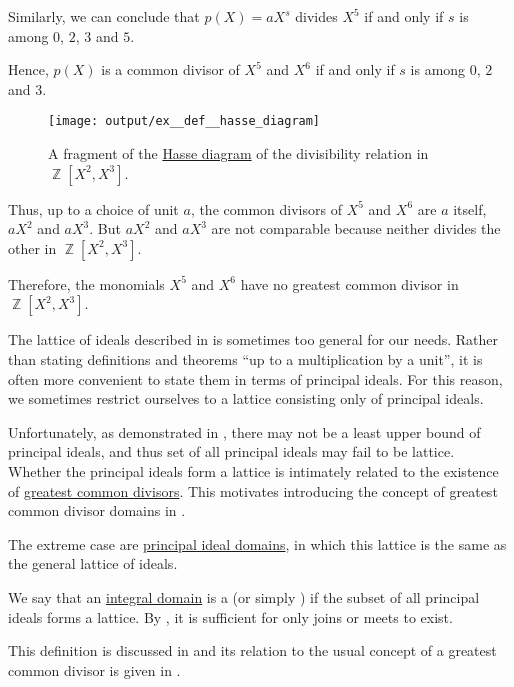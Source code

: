 \begin{example}
\begin{thmenum}
    Similarly, we can conclude that \( p(X) = aX^s \) divides \( X^5 \) if and only if \( s \) is among \( 0 \), \( 2 \), \( 3 \) and \( 5 \).

    Hence, \( p(X) \) is a common divisor of \( X^5 \) and \( X^6 \) if and only if \( s \) is among \( 0 \), \( 2 \) and \( 3 \).

    \begin{figure}[!ht]
      \centering
      \texttt{[image: output/ex\_\_def\_\_hasse\_diagram]}
      \caption{A fragment of the \hyperref[def:hasse_diagram]{Hasse diagram} of the divisibility relation in \( \BbbZ[X^2, X^3] \).}
      \label{fig:ex:common_polynomial_divisors/distinct}
    \end{figure}

    Thus, up to a choice of unit \( a \), the common divisors of \( X^5 \) and \( X^6 \) are \( a \) itself, \( aX^2 \) and \( aX^3 \). But \( aX^2 \) and \( aX^3 \) are not comparable because neither divides the other in \( \BbbZ[X^2, X^3] \).

    Therefore, the monomials \( X^5 \) and \( X^6 \) have no greatest common divisor in \( \BbbZ[X^2, X^3] \).
  \end{thmenum}
\end{example}

\begin{remark}\label{rem:lattice_of_principal_ideals}
  The lattice of ideals described in  is sometimes too general for our needs. Rather than stating definitions and theorems \enquote{up to a multiplication by a unit}, it is often more convenient to state them in terms of principal ideals. For this reason, we sometimes restrict ourselves to a lattice consisting only of principal ideals.

  Unfortunately, as demonstrated in , there may not be a least upper bound of principal ideals, and thus set of all principal ideals may fail to be lattice. Whether the principal ideals form a lattice is intimately related to the existence of \hyperref[def:gcd_and_lcm]{greatest common divisors}. This motivates introducing the concept of greatest common divisor domains in .

  The extreme case are \hyperref[def:principal_ideal_domain]{principal ideal domains}, in which this lattice is the same as the general lattice of ideals.
\end{remark}

\begin{definition}\label{def:gcd_domain}\mimprovised
  We say that an \hyperref[def:integral_domain]{integral domain} is a  (or simply ) if the subset of all principal ideals forms a lattice. By , it is sufficient for only joins or meets to exist.

  This definition is discussed in  and its relation to the usual concept of a greatest common divisor is given in .
\end{definition}

